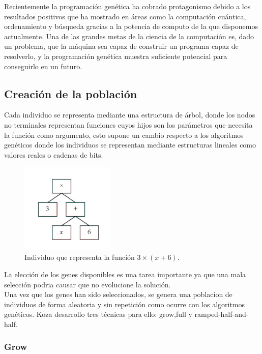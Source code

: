 \documentclass[12pt]{article} \usepackage[utf8x]{inputenc}
\begin{document}
Recientemente la programación genética ha cobrado protagonismo debido a los resultados positivos que ha mostrado en áreas como la computación cuántica, ordenamiento y búsqueda gracias a la potencia de computo de la que disponemos actualmente. Una de las grandes metas de la ciencia de la computación es, dado un problema, que la máquina sea capaz de construir un programa capaz de resolverlo, y la programación genética muestra suficiente potencial para conseguirlo en un futuro.\\


\subsection {Creación de la población}

Cada individuo se representa mediante una estructura de árbol, donde los nodos no terminales representan funciones cuyos hijos son los parámetros que necesita la función como argumento, esto supone un cambio respecto a los algoritmos genéticos donde los individuos se representan mediante estructuras lineales como valores reales o cadenas de bits.

\begin{figure}[H]
    \centering
    \includegraphics[width=0.4\textwidth]{individuo.PNG}
    \caption{Individuo que representa la función \(3\times(x+6)\).}
    \label{fig:dfd:1}
\end{figure}

La elección de los genes disponibles es una tarea importante ya que una mala selección podria causar que no evolucione la solución.\\

Una vez que los genes han sido seleccionados, se genera una poblacion de individuos de forma aleatoria y sin repetición como ocurre con los algoritmos genéticos. Koza desarrollo tres técnicas para ello: grow,full y ramped-half-and-half.

\subsubsection{Grow}
\end{document}

